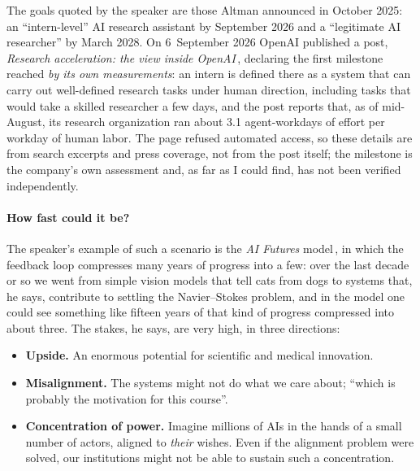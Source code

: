 \begin{beyond}
The goals quoted by the speaker are those Altman announced in October 2025: an ``intern-level'' AI research assistant by September 2026 and a ``legitimate AI researcher'' by March 2028. On 6~September 2026 OpenAI published a post, \emph{Research acceleration: the view inside OpenAI}\,\citep{openai2026ra}, declaring the first milestone reached \emph{by its own measurements}: an intern is defined there as a system that can carry out well-defined research tasks under human direction, including tasks that would take a skilled researcher a few days, and the post reports that, as of mid-August, its research organization ran about 3.1 agent-workdays of effort per workday of human labor. The page refused automated access, so these details are from search excerpts and press coverage, not from the post itself; the milestone is the company's own assessment and, as far as I could find, has not been verified independently.
\end{beyond}

\paragraph{How fast could it be?}
The speaker's example of such a scenario is the \emph{AI Futures} model\,\citep{aifutures2025,aifutures2025dec}, in which the feedback loop compresses many years of progress into a few: over the last decade or so we went from simple vision models that tell cats from dogs to systems that, he says, contribute to settling the Navier--Stokes problem, and in the model one could see something like fifteen years of that kind of progress compressed into about three\flag. The stakes, he says, are very high, in three directions:
\begin{itemize}
  \item \textbf{Upside.} An enormous potential for scientific and medical innovation.
  \item \textbf{Misalignment.} The systems might not do what we care about; ``which is probably the motivation for this course''.
  \item \textbf{Concentration of power.} Imagine millions of AIs in the hands of a small number of actors, aligned to \emph{their} wishes. Even if the alignment problem were solved, our institutions might not be able to sustain such a concentration.
\end{itemize}

